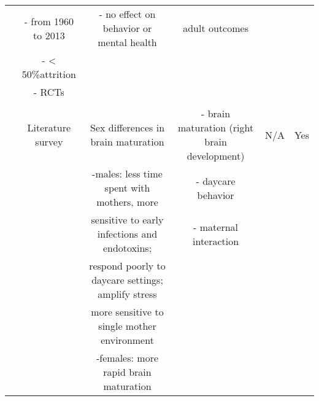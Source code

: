 \begin{tabular}{cccccc}
	&	- from 1960 to 2013	&	- no effect on behavior or mental health	&	adult outcomes	&		&		\\ 
	&	- < 50\%attrition	&		&		&		&		\\ 
	&	- RCTs	&		&		&		&		\\ \\ \midrule
\citet{Schore_2017_IMHJ}	&	Literature survey	&	Sex differences in brain maturation 	&	- brain maturation (right brain development)	&	N/A	&	Yes	\\ 
	&		&	-males: less time spent with mothers, more	&	- daycare behavior	&		&		\\ 
	&		&	sensitive to early infections and endotoxins; 	&	- maternal interaction 	&		&		\\ 
	&		&	respond poorly to daycare settings; amplify stress	&		&		&		\\ 
	&		&	more sensitive to single mother environment	&		&		&		\\ 
	&		&	-females: more rapid brain maturation	&		&		&		\\ \bottomrule
\end{tabular}											